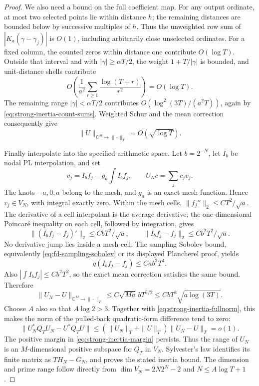 \begin{proof}
We also need a bound on the full coefficient map. For any output
ordinate, at most two selected points lie within distance \(h\);
the remaining distances are bounded below by successive multiples of
\(h\). Thus the unweighted row sum of
\(|K_a(\gamma-\gamma_j)|\) is \(O(1)\), including arbitrarily
close unselected ordinates. For a fixed column, the counted zeros
within distance one contribute \(O(\log T)\). Outside that interval
and with \(|\gamma|\ge\alpha T/2\), the weight
\(1+T/|\gamma|\) is bounded, and unit-distance shells contribute
\[
 O\left(\frac1{a^2}\sum_{r\ge1}
                    \frac{\log(T+r)}{r^2}\right)=O(\log T).
\]
The remaining range \(|\gamma|<\alpha T/2\) contributes
\(O(\log^2(3T)/(a^2T))\), again by
\eqref{eq:strong-inertia-count-sums}. Weighted Schur and the mean
correction consequently give
\begin{equation}\label{eq:strong-inertia-fullnorm}
 \|U\|_{\mathbb C^M\to\|\cdot\|_T}=O(\sqrt{\log T}).
\end{equation}

Finally interpolate into the specified arithmetic space. Let
\(b=2^{-N}\), let \(I_b\) be nodal PL interpolation, and set
\[
 v_j=I_bf_j-g_a\int I_bf_j,\qquad U_Nc=\sum_jc_jv_j.
\]
The knots \(-a,0,a\) belong to the mesh, and \(g_a\) is an exact
mesh function. Hence \(v_j\in V_N\), with integral exactly zero.
Within the mesh cells,
\(\|f_j''\|_2\le CT^2/\sqrt a\). The derivative of a cell
interpolant is the average derivative; the one-dimensional Poincar\'e
inequality on each cell, followed by integration, gives
\[
 \|(I_bf_j-f_j)'\|_2\le CbT^2/\sqrt a,
 \qquad
 \|I_bf_j-f_j\|_2\le Cb^2T^2/\sqrt a.
\]
No derivative jump lies inside a mesh cell. The sampling Sobolev
bound, equivalently \eqref{eq:fd-sampling-sobolev} or its displayed
Plancherel proof, yields
\[
 q(I_bf_j-f_j)\le Ca b^2T^4.
\]
Also \(|\int I_bf_j|\le Cb^2T^2\), so the exact mean correction
satisfies the same bound. Therefore
\[
 \|U_N-U\|_{\mathbb C^M\to\|\cdot\|_T}
   \le C\sqrt{Ma}\,bT^{5/2}
   \le CbT^3\sqrt{a\log(3T)}.
\]
Choose \(A\) also so that \(A\log2>3\). Together with
\eqref{eq:strong-inertia-fullnorm}, this makes the norm of the
pulled-back quadratic-form difference tend to zero:
\[
 \|U_N^*Q_TU_N-U^*Q_TU\|
 \le(\|U_N\|_T+\|U\|_T)\|U_N-U\|_T=o(1).
\]
The positive margin in \eqref{eq:strong-inertia-margin} persists.
Thus the range of \(U_N\) is an \(M\)-dimensional positive subspace
for \(Q_T\) in \(V_N\). Sylvester's law identifies its finite
matrix as \(T H_N-G_N\), and proves the stated inertia bound.
The dimension and prime range follow directly from
\(\dim V_N=2N2^N-2\) and \(N\le A\log T+1\).
\end{proof}

